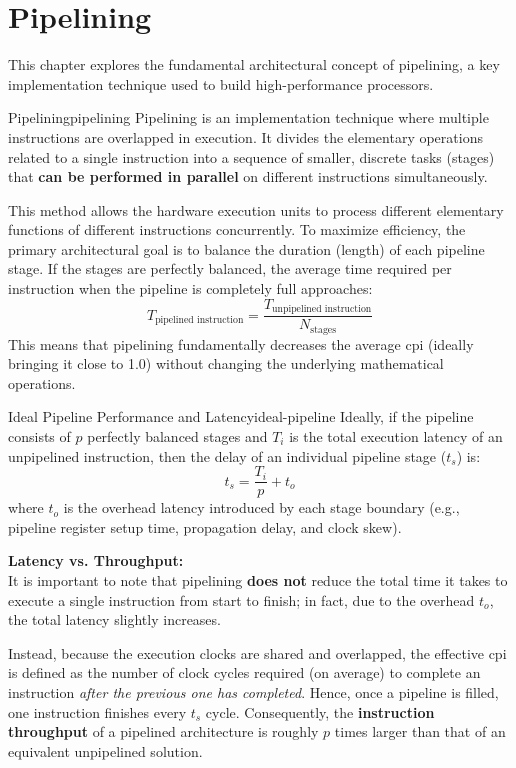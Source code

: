 \chapter{Pipelining}
This chapter explores the fundamental architectural concept of pipelining, a key implementation technique used to build high-performance processors.

\begin{definition}{Pipelining}{pipelining}
    Pipelining is an implementation technique where multiple instructions are overlapped in execution. It divides the elementary operations related to a single instruction into a sequence of smaller, discrete tasks (stages) that \textbf{can be performed in parallel} on different instructions simultaneously.
\end{definition}

\noindent This method allows the hardware execution units to process different elementary functions of different instructions concurrently. To maximize efficiency, the primary architectural goal is to balance the duration (length) of each pipeline stage. If the stages are perfectly balanced, the average time required per instruction when the pipeline is completely full approaches:
\[
    T_{\text{pipelined instruction}} = \frac{T_{\text{unpipelined instruction}}}{N_{\text{stages}}}
\]
This means that pipelining fundamentally decreases the average \gls{cpi} (ideally bringing it close to 1.0) without changing the underlying mathematical operations.

\begin{concept}{Ideal Pipeline Performance and Latency}{ideal-pipeline}
    Ideally, if the pipeline consists of \(p\) perfectly balanced stages and \(T_i\) is the total execution latency of an unpipelined instruction, then the delay of an individual pipeline stage (\(t_s\)) is:
    \[
        t_s = \frac{T_i}{p} + t_o
    \]
    where \(t_o\) is the overhead latency introduced by each stage boundary (e.g., pipeline register setup time, propagation delay, and clock skew). 

    \tcblower

    \textbf{Latency vs. Throughput:}\\
    It is important to note that pipelining \textbf{does not} reduce the total time it takes to execute a single instruction from start to finish; in fact, due to the overhead \(t_o\), the total latency slightly increases. 

    Instead, because the execution clocks are shared and overlapped, the effective \gls{cpi} is defined as the number of clock cycles required (on average) to complete an instruction \textit{after the previous one has completed}. Hence, once a pipeline is filled, one instruction finishes every \(t_s\) cycle. Consequently, the \textbf{instruction throughput} of a pipelined architecture is roughly \(p\) times larger than that of an equivalent unpipelined solution.
\end{concept}

